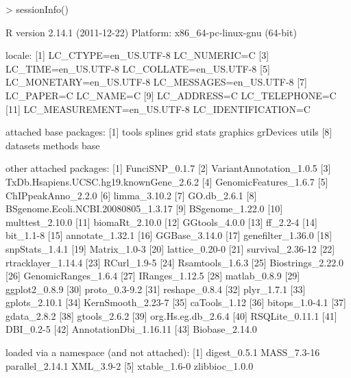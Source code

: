 \documentclass[a4paper]{article}
\begin{document}
\begin{Schunk}
\begin{Sinput}
> sessionInfo()
\end{Sinput}
\begin{Soutput}
R version 2.14.1 (2011-12-22)
Platform: x86_64-pc-linux-gnu (64-bit)

locale:
 [1] LC_CTYPE=en_US.UTF-8       LC_NUMERIC=C              
 [3] LC_TIME=en_US.UTF-8        LC_COLLATE=en_US.UTF-8    
 [5] LC_MONETARY=en_US.UTF-8    LC_MESSAGES=en_US.UTF-8   
 [7] LC_PAPER=C                 LC_NAME=C                 
 [9] LC_ADDRESS=C               LC_TELEPHONE=C            
[11] LC_MEASUREMENT=en_US.UTF-8 LC_IDENTIFICATION=C       

attached base packages:
 [1] tools     splines   grid      stats     graphics  grDevices utils    
 [8] datasets  methods   base     

other attached packages:
 [1] FunciSNP_0.1.7                         
 [2] VariantAnnotation_1.0.5                
 [3] TxDb.Hsapiens.UCSC.hg19.knownGene_2.6.2
 [4] GenomicFeatures_1.6.7                  
 [5] ChIPpeakAnno_2.2.0                     
 [6] limma_3.10.2                           
 [7] GO.db_2.6.1                            
 [8] BSgenome.Ecoli.NCBI.20080805_1.3.17    
 [9] BSgenome_1.22.0                        
[10] multtest_2.10.0                        
[11] biomaRt_2.10.0                         
[12] GGtools_4.0.0                          
[13] ff_2.2-4                               
[14] bit_1.1-8                              
[15] annotate_1.32.1                        
[16] GGBase_3.14.0                          
[17] genefilter_1.36.0                      
[18] snpStats_1.4.1                         
[19] Matrix_1.0-3                           
[20] lattice_0.20-0                         
[21] survival_2.36-12                       
[22] rtracklayer_1.14.4                     
[23] RCurl_1.9-5                            
[24] Rsamtools_1.6.3                        
[25] Biostrings_2.22.0                      
[26] GenomicRanges_1.6.4                    
[27] IRanges_1.12.5                         
[28] matlab_0.8.9                           
[29] ggplot2_0.8.9                          
[30] proto_0.3-9.2                          
[31] reshape_0.8.4                          
[32] plyr_1.7.1                             
[33] gplots_2.10.1                          
[34] KernSmooth_2.23-7                      
[35] caTools_1.12                           
[36] bitops_1.0-4.1                         
[37] gdata_2.8.2                            
[38] gtools_2.6.2                           
[39] org.Hs.eg.db_2.6.4                     
[40] RSQLite_0.11.1                         
[41] DBI_0.2-5                              
[42] AnnotationDbi_1.16.11                  
[43] Biobase_2.14.0                         

loaded via a namespace (and not attached):
[1] digest_0.5.1    MASS_7.3-16     parallel_2.14.1 XML_3.9-2      
[5] xtable_1.6-0    zlibbioc_1.0.0 
\end{Soutput}
\end{Schunk}
\end{document}
